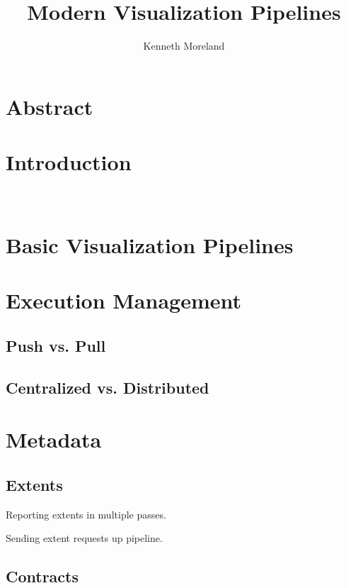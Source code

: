 \documentclass[twocolumn,10pt]{article}
\title{Modern Visualization Pipelines}
\author{Kenneth Moreland}
\date{}
\newcommand*{\lcite}[1]{~\cite{#1}}
\begin{document}
\maketitle


\section*{Abstract}


\section{Introduction}
\label{sec:Introduction}

\lcite{VTK}


\section{Basic Visualization Pipelines}
\label{sec:BasicVisualizationPipelines}


\section{Execution Management}
\label{sec:ExecutionManagement}

\subsection{Push vs. Pull}
\label{sec:PushPull}

\subsection{Centralized vs. Distributed}
\label{sec:CentralizedDistributed}


\section{Metadata}
\label{sec:Metadata}

\subsection{Extents}
\label{sec:Extents}

Reporting extents in multiple passes.

Sending extent requests up pipeline.

\subsection{Contracts}
\label{sec:Contracts}
\end{document}
